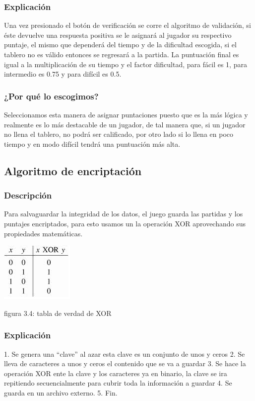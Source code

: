 \documentclass[a4paper,11pt]{article}
\begin{document}
\subsubsection{Explicación}
	Una vez presionado el botón de verificación se corre el algoritmo de validación, si éste devuelve una respuesta positiva se le asignará al jugador su respectivo puntaje, el mismo que dependerá del tiempo y de la dificultad escogida, si el tablero no es válido entonces se regresará a la partida. La puntuación final es igual a la multiplicación de su tiempo y el factor dificultad, para fácil es 1, para intermedio es 0.75 y para difícil es 0.5. 
\subsubsection{¿Por qué lo escogimos?}
Seleccionamos esta manera de asignar puntaciones puesto que es la más lógica y realmente es lo más destacable de un jugador, de tal manera que, si un jugador no llena el tablero, no podrá ser calificado, por otro lado si lo llena en poco tiempo y en modo difícil tendrá una puntuación más alta.

\subsection{Algoritmo de encriptación}
\subsubsection{Descripción}
Para salvaguardar la integridad de los datos, el juego guarda las partidas y los puntajes encriptados, para esto usamos un la operación XOR aprovechando sus propiedades matemáticas.


\centerline{\includegraphics{xor.png}}
\centerline{figura 3.4: tabla de verdad de XOR }

\subsubsection{Explicación}
1.	Se genera una “clave” al azar esta clave es un conjunto de unos y ceros
2.	Se lleva de caracteres a unos y ceros el contenido que se va a guardar
3.	Se hace la operación XOR ente la clave y los caracteres ya en binario, la clave se ira repitiendo secuencialmente para cubrir toda la información a guardar
4.	Se guarda en un archivo externo.
5.	Fin.
\end{document}
